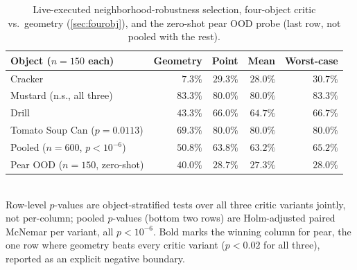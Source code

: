 \documentclass[journal]{IEEEtran}
\begin{document}
\begin{table}[t]
\centering
\caption{Live-executed neighborhood-robustness selection, four-object critic vs.\ geometry (\cref{sec:fourobj}), and the zero-shot pear OOD probe (last row, not pooled with the rest).}
\label{tab:fourobj_neighborhood}
\small
\begin{tabular}{@{}lrrrr@{}}
\toprule
Object ($n{=}150$ each) & Geometry & Point & Mean & Worst-case \\
\midrule
Cracker & $7.3\%$ & $29.3\%$ & $28.0\%$ & $30.7\%$ \\
Mustard (n.s., all three) & $83.3\%$ & $80.0\%$ & $80.0\%$ & $83.3\%$ \\
Drill & $43.3\%$ & $66.0\%$ & $64.7\%$ & $66.7\%$ \\
Tomato Soup Can ($p{=}0.0113$) & $69.3\%$ & $80.0\%$ & $80.0\%$ & $80.0\%$ \\
Pooled ($n{=}600$, $p{<}10^{-6}$) & $50.8\%$ & $63.8\%$ & $63.2\%$ & $65.2\%$ \\
\midrule
Pear OOD ($n{=}150$, zero-shot) & $\mathbf{40.0\%}$ & $28.7\%$ & $27.3\%$ & $28.0\%$ \\
\bottomrule
\end{tabular}
\\[0.3em]
{\footnotesize Row-level $p$-values are object-stratified tests over all three critic variants jointly, not per-column; pooled $p$-values (bottom two rows) are Holm-adjusted paired McNemar per variant, all $p{<}10^{-6}$. Bold marks the winning column for pear, the one row where geometry beats every critic variant ($p<0.02$ for all three), reported as an explicit negative boundary.}
\end{table}
\end{document}
